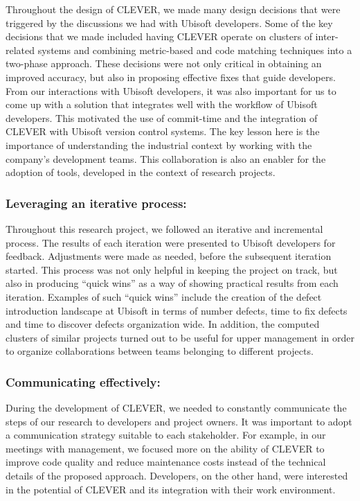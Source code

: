 \documentclass[sigconf]{acmart}
\begin{document}
Throughout the design of CLEVER, we made many design decisions that were
triggered by the discussions we had with Ubisoft developers. Some of the
key decisions that we made included having CLEVER operate on clusters of
inter-related systems and combining metric-based and code matching
techniques into a two-phase approach. These decisions were not only
critical in obtaining an improved accuracy, but also in proposing
effective fixes that guide developers. From our interactions with
Ubisoft developers, it was also important for us to come up with a
solution that integrates well with the workflow of Ubisoft developers.
This motivated the use of commit-time and the integration of CLEVER with
Ubisoft version control systems. The key lesson here is the importance
of understanding the industrial context by working with the company's
development teams. This collaboration is also an enabler for the
adoption of tools, developed in the context of research projects.

\subsubsection{Leveraging an iterative
process:}\label{leveraging-an-iterative-process}

Throughout this research project, we followed an iterative and
incremental process. The results of each iteration were presented to
Ubisoft developers for feedback. Adjustments were made as needed, before
the subsequent iteration started. This process was not only helpful in
keeping the project on track, but also in producing ``quick wins'' as a
way of showing practical results from each iteration. Examples of such
``quick wins'' include the creation of the defect introduction landscape
at Ubisoft in terms of number defects, time to fix defects and time to
discover defects organization wide. In addition, the computed clusters of
similar projects turned out to be useful for upper management in order
to organize collaborations between teams belonging to different
projects.

\subsubsection{Communicating
effectively:}\label{communicating-effectively}

During the development of CLEVER, we needed to constantly communicate
the steps of our research to developers and project owners. It was
important to adopt a communication strategy suitable to each
stakeholder. For example, in our meetings with management, we focused
more on the ability of CLEVER to improve code quality and reduce
maintenance costs instead of the technical details of the proposed
approach. Developers, on the other hand, were interested in the
potential of CLEVER and its integration with their work environment.
\end{document}
